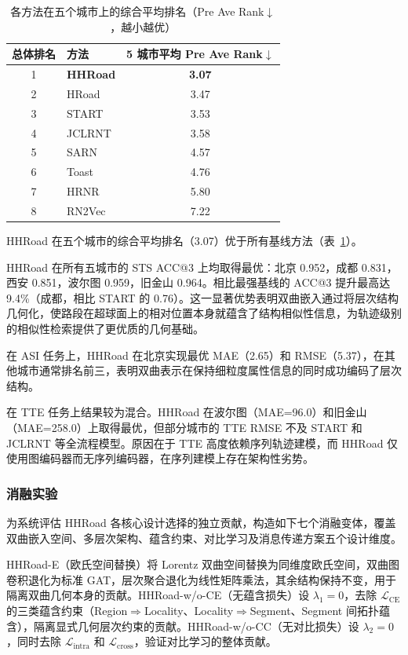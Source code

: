 \begin{table}[H]
    \centering
    \caption{各方法在五个城市上的综合平均排名（Pre Ave Rank$\downarrow$，越小越优）}
    \label{tab:HHRoad_ranking}
    \begin{tabular}{clc}
        \hline
        \textbf{总体排名} & \textbf{方法} & \textbf{5 城市平均 Pre Ave Rank$\downarrow$} \\
        \hline
        1 & \textbf{HHRoad} & \textbf{3.07} \\
        2 & HRoad & 3.47 \\
        3 & START & 3.53 \\
        4 & JCLRNT & 3.58 \\
        5 & SARN & 4.57 \\
        6 & Toast & 4.76 \\
        7 & HRNR & 5.80 \\
        8 & RN2Vec & 7.22 \\
        \hline
    \end{tabular}
\end{table}

HHRoad 在五个城市的综合平均排名（3.07）优于所有基线方法（表~\ref{tab:HHRoad_ranking}）。

HHRoad 在所有五城市的 STS ACC@3 上均取得最优：北京 0.952，成都 0.831，西安 0.851，波尔图 0.959，旧金山 0.964。相比最强基线的 ACC@3 提升最高达 9.4\%（成都，相比 START 的 0.76）。这一显著优势表明双曲嵌入通过将层次结构几何化，使路段在超球面上的相对位置本身就蕴含了结构相似性信息，为轨迹级别的相似性检索提供了更优质的几何基础。

在 ASI 任务上，HHRoad 在北京实现最优 MAE（2.65）和 RMSE（5.37），在其他城市通常排名前三，表明双曲表示在保持细粒度属性信息的同时成功编码了层次结构。

在 TTE 任务上结果较为混合。HHRoad 在波尔图（MAE=96.0）和旧金山（MAE=258.0）上取得最优，但部分城市的 TTE RMSE 不及 START 和 JCLRNT 等全流程模型。原因在于 TTE 高度依赖序列轨迹建模，而 HHRoad 仅使用图编码器而无序列编码器，在序列建模上存在架构性劣势。

\subsubsection{消融实验}

为系统评估 HHRoad 各核心设计选择的独立贡献，构造如下七个消融变体，覆盖双曲嵌入空间、多层次架构、蕴含约束、对比学习及消息传递方案五个设计维度。

HHRoad-E（欧氏空间替换）将 Lorentz 双曲空间替换为同维度欧氏空间，双曲图卷积退化为标准 GAT，层次聚合退化为线性矩阵乘法，其余结构保持不变，用于隔离双曲几何本身的贡献。HHRoad-w/o-CE（无蕴含损失）设 $\lambda_1=0$，去除 $\mathcal{L}_{\text{CE}}$ 的三类蕴含约束（Region$\Rightarrow$Locality、Locality$\Rightarrow$Segment、Segment 间拓扑蕴含），隔离显式几何层次约束的贡献。HHRoad-w/o-CC（无对比损失）设 $\lambda_2=0$，同时去除 $\mathcal{L}_{\text{intra}}$ 和 $\mathcal{L}_{\text{cross}}$，验证对比学习的整体贡献。

